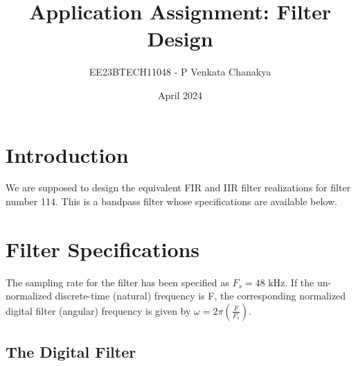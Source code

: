\documentclass{article}
\title{Application Assignment: Filter Design}
\author{EE23BTECH11048 - P Venkata Chanakya}
\date{April 2024}
\begin{document}
\maketitle

\section{Introduction}
We are supposed to design the equivalent FIR and IIR filter realizations for filter number 114.  
This is a bandpass filter whose specifications are available below.
\section{Filter Specifications}
The sampling rate for the filter has been specified as $F_s =  48$ kHz.	If the un-normalized  discrete-time (natural) frequency is F, the corresponding normalized digital filter (angular) frequency is given by $\omega = 2\pi
\left(\frac{F}{F_s}\right)$.
\subsection{The Digital Filter}
\end{document}

